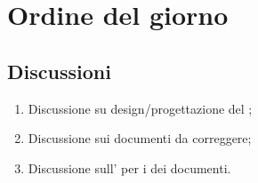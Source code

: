 \section{Ordine del giorno} \label{sec:agenda}
\subsection{Discussioni} \label{subsec:discussione}
\begin{enumerate}
    \item Discussione su design/progettazione del ;
    \item Discussione sui documenti da correggere;
    \item Discussione sull' per i  dei documenti.
\end{enumerate}
